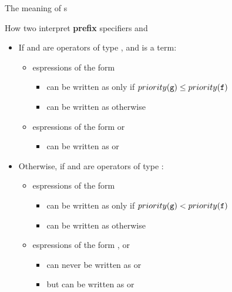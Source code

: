 \documentclass[handout]{beamer}
\begin{document}
\begin{frame}[allowframebreaks]{The meaning of s}

    \begin{exampleblock}{How two interpret \textbf{prefix} specifiers  and }
        \begin{itemize}
            \item If  and  are operators of type , and  is a term:
            \begin{itemize}
                \item espressions of the form \alert{}
                \begin{itemize}
                    \item can be written as \alert{} only if $priority(\texttt{g}) \leq priority(\texttt{f})$
                    \item can be written as \alert{} otherwise
                \end{itemize}

                \item espressions of the form \alert{} or \alert{}
                \begin{itemize}
                    \item can be written as \alert{} or \alert{}
                \end{itemize}
            \end{itemize}

            \item Otherwise, if  and  are operators of type :
            \begin{itemize}
                \item espressions of the form \alert{}
                \begin{itemize}
                    \item can be written as \alert{} only if $priority(\texttt{g}) < priority(\texttt{f})$
                    \item can be written as \alert{} otherwise
                \end{itemize}

                \item espressions of the form \alert{}, or \alert{}
                \begin{itemize}
                    \item can \alert{never} be written as \alert{} or \alert{}
                    \item but can be written as \alert{} or \alert{}
                \end{itemize}
            \end{itemize}
        \end{itemize}
    \end{exampleblock}


\end{frame}
\end{document}
